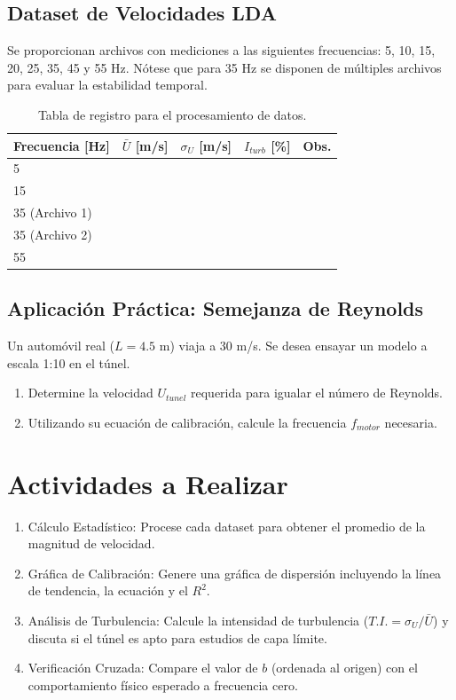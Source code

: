 \documentclass[11pt, a4paper]{article}
\begin{document}
\subsection{Dataset de Velocidades LDA}
Se proporcionan archivos con mediciones a las siguientes frecuencias: 5, 10, 15, 20, 25, 35, 45 y 55 Hz. Nótese que para 35 Hz se disponen de múltiples archivos para evaluar la estabilidad temporal.

\begin{table}[htbp]
    \centering
    \begin{tabular}{lcccc}
        \toprule
        Frecuencia [Hz] & $\bar{U}$ [m/s] & $\sigma_U$ [m/s] & $I_{turb}$ [\%] & Obs. \\
        \midrule
        5  &  &  &  &  \\
        15 &  &  &  &  \\
        35 (Archivo 1) &  &  &  &  \\
        35 (Archivo 2) &  &  &  &  \\
        55 &  &  &  &  \\
        \bottomrule
    \end{tabular}
    \caption{Tabla de registro para el procesamiento de datos.}
\end{table}

\subsection{Aplicación Práctica: Semejanza de Reynolds}
Un automóvil real ($L=4.5$ m) viaja a 30 m/s. Se desea ensayar un modelo a escala 1:10 en el túnel.
\begin{enumerate}
    \item Determine la velocidad $U_{tunel}$ requerida para igualar el número de Reynolds.
    \item Utilizando su ecuación de calibración, calcule la frecuencia $f_{motor}$ necesaria.
\end{enumerate}

\section{Actividades a Realizar}
\begin{enumerate}
    \item Cálculo Estadístico: Procese cada dataset para obtener el promedio de la magnitud de velocidad.
    \item Gráfica de Calibración: Genere una gráfica de dispersión incluyendo la línea de tendencia, la ecuación y el $R^2$.
    \item Análisis de Turbulencia: Calcule la intensidad de turbulencia ($T.I. = \sigma_U / \bar{U}$) y discuta si el túnel es apto para estudios de capa límite.
    \item Verificación Cruzada: Compare el valor de $b$ (ordenada al origen) con el comportamiento físico esperado a frecuencia cero.
\end{enumerate}
\end{document}
